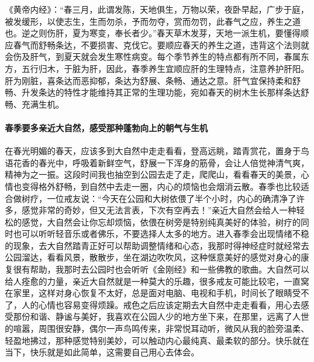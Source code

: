 《黄帝内经》：“春三月，此谓发陈，天地俱生，万物以荣，夜卧早起，广步于庭，被发缓形，以使志生，生而勿杀，予而勿夺，赏而勿罚，此春气之应，养生之道也。逆之则伤肝，夏为寒变，奉长者少。”春天草木发芽，天地一派生机，要懂得顺应春气而舒畅条达，不要损害、克伐它。要顺应春天的养生之道，违背这个法则就会伤及肝气，到夏天就会发生寒性病变。每个季节养生的特点都有所不同，春属东方，五行归木，于脏为肝，因此，春季养生宜顺应肝的生理特点，注意养护肝阳。肝为刚脏，喜条达而恶抑郁，条达为舒展、条畅、通达之意。肝气宜保持柔和舒畅、升发条达的特性才能维持其正常的生理功能，宛如春天的树木生长那样条达舒畅、充满生机。

\paragraph{春季要多亲近大自然，感受那种蓬勃向上的朝气与生机}

在春光明媚的春天，应该多到大自然中走走看看，登高远眺，踏青赏花，置身于鸟语花香的春光中，呼吸着新鲜空气，舒展一下浑身的筋骨，会让人倍觉神清气爽，精神为之一振。这段时间我也抽空到公园去走了走，爬爬山，看看春天的美景，心情也变得格外舒畅，到自然中去走一圈，内心的烦恼也会烟消云散。春季也比较适合做树疗，一位戒友说：“今天在公园和大树依偎了半个小时，内心的确清净了许多，感觉非常的奇妙，但又无法言表，下次有空再去！”亲近大自然会给人一种轻松的感觉，大自然会让你忘却烦恼，依偎在树旁是特别纯真美好的体验，树疗的同时也可以听听轻音乐或者佛乐，不要选择人太多的地方。进入春季会出现情绪不稳的现象，去大自然踏青正好可以帮助调整情绪和心态，我那时得神经症时就经常去公园溜达，看看风景，散散步，坐在湖边吹吹风，这种惬意美好的感觉对身心的康复很有帮助，我那时去公园时也会听听《金刚经》和一些佛教的歌曲。大自然可以给人痊愈的力量，亲近大自然就是一种莫大的乐趣，很多戒友可能比较宅，一直窝在家里，这样对身心恢复不太好，总是面对电脑、电视和手机，时间长了眼睛受不了，人的心情也容易变得烦躁。戒色之后应该定期去大自然中走走看看，用心去感受那份和谐、静谧与美好，我喜欢在公园人少的地方坐下来，在那里，远离了人世的喧嚣，周围很安静，偶尔一声鸟鸣传来，非常悦耳动听，微风从我的脸旁温柔、轻盈地拂过，那种感觉特别美妙，可以触动内心最纯真、最柔软的部分。快乐就在当下，快乐就是如此简单，这需要自己用心去体会。

